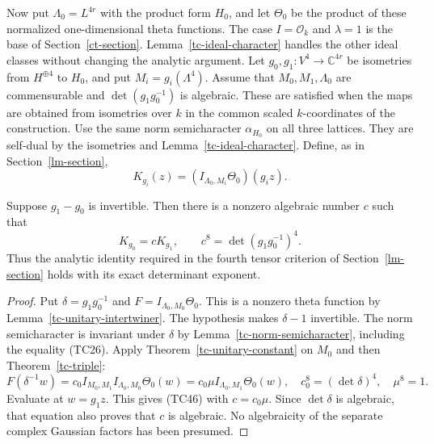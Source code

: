Now put $\Lambda_0=L^{4r}$ with the product form $H_0$,
and let $\Theta_0$ be the product of these normalized
one-dimensional theta functions.
The case $I=\mathcal O_k$ and $\lambda=1$ is the base of
Section~\ref{ct-section}.  Lemma~\ref{tc-ideal-character}
handles the other ideal classes without changing the
analytic argument.
Let $g_0,g_1:V^4\to\mathbb C^{4r}$ be isometries from
$H^{\oplus4}$ to $H_0$, and put $M_i=g_i(\Lambda^4)$.
Assume that $M_0,M_1,\Lambda_0$ are commensurable and
$\det(g_1g_0^{-1})$ is algebraic.  These are satisfied
when the maps are obtained from isometries over $k$ in
the common scaled $k$-coordinates of the construction.
Use the same norm semicharacter $\alpha_{H_0}$ on all
three lattices.  They are self-dual by the isometries and
Lemma~\ref{tc-ideal-character}.
Define, as in Section~\ref{lm-section},
\[
          K_{g_i}(z)=(I_{\Lambda_0,M_i}\Theta_0)(g_i z).
 \tag{TC45}
\]

\begin{theorem}\label{tc-kernel-ratio}
Suppose $g_1-g_0$ is invertible.  Then there is a nonzero
algebraic number $c$ such that
\[
       K_{g_0}=cK_{g_1},\qquad
       c^8=\det(g_1g_0^{-1})^4.
 \tag{TC46}
\]
Thus the analytic identity required in the fourth tensor
criterion of Section~\ref{lm-section} holds with its exact
determinant exponent.
\end{theorem}
\begin{proof}
Put $\delta=g_1g_0^{-1}$ and $F=I_{\Lambda_0,M_0}\Theta_0$.
This is a nonzero theta function by
Lemma~\ref{tc-unitary-intertwiner}.
The hypothesis makes $\delta-1$ invertible.
The norm semicharacter is invariant under $\delta$ by
Lemma~\ref{tc-norm-semicharacter}, including the equality
(TC26).  Apply Theorem~\ref{tc-unitary-constant} on $M_0$
and then Theorem~\ref{tc-triple}:
\[
 F(\delta^{-1}w)
    =c_0 I_{M_0,M_1}I_{\Lambda_0,M_0}\Theta_0(w)
    =c_0\mu I_{\Lambda_0,M_1}\Theta_0(w),
 \quad c_0^8=(\det\delta)^4,\quad\mu^8=1.
\]
Evaluate at $w=g_1z$.  This gives (TC46) with $c=c_0\mu$.
Since $\det\delta$ is algebraic, that equation also proves
that $c$ is algebraic.  No algebraicity of the separate
complex Gaussian factors has been presumed.
\end{proof}

